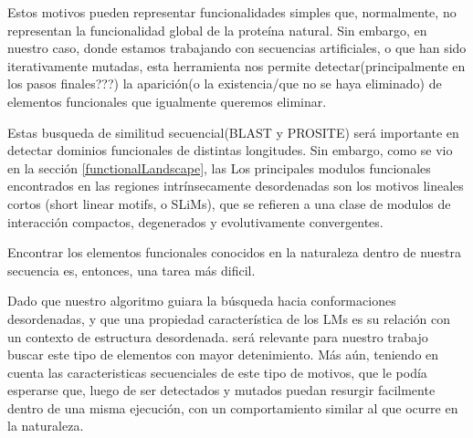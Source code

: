 Estos motivos pueden representar funcionalidades simples que, normalmente, no representan la funcionalidad global de la proteína natural.
Sin embargo, en nuestro caso, donde estamos trabajando con secuencias artificiales, o que han sido iterativamente mutadas, 
esta herramienta nos permite detectar(principalmente en los pasos finales???) la aparición(o la existencia/que no se haya eliminado) de elementos funcionales que igualmente queremos eliminar.  













Estas busqueda de similitud secuencial(BLAST y PROSITE) será importante en detectar dominios funcionales de distintas longitudes. 
Sin embargo, como se vio en la sección \ref{functionalLandscape}, las   
Los principales modulos funcionales encontrados en las regiones intrínsecamente desordenadas son los motivos lineales cortos (short linear motifs, o SLiMs), que se refieren a una clase de modulos de interacción compactos, 
degenerados y evolutivamente convergentes.


Encontrar los elementos funcionales conocidos en la naturaleza dentro de nuestra secuencia es, entonces, una tarea más dificil.
 
Dado que nuestro algoritmo guiara la búsqueda hacia conformaciones desordenadas, y que una propiedad característica de los LMs es su relación con un contexto de estructura desordenada\cite{fuxreiter2007local}.
será relevante para nuestro trabajo buscar este tipo de elementos con mayor detenimiento. Más aún, teniendo en cuenta las caracteristicas secuenciales de este tipo de motivos, que le 
podía esperarse que, luego de ser detectados y mutados puedan resurgir facilmente dentro de una misma ejecución, con un comportamiento similar al que ocurre en la naturaleza.




